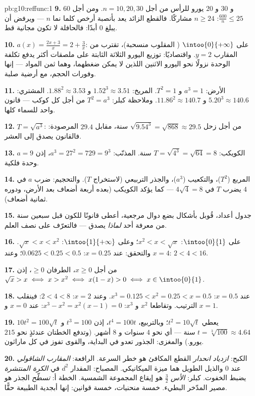 \begin{solution}{pb:g10:reffunc:1}
\textbf{9.} $60$ و $30$ و $20$ يورو للرأس من أجل $n = 10, 20,
30$. ومن أجل $\frac{600}{n} \leq 25$: $n \geq 24$ مشاركًا. فالقطع
الزائد يعد بأنصبة أرخص كلما نما $n$ --- ويرفض
أن يبلغ $0$ أبدًا: فالحافلة لا تكون مجانية قط.

\textbf{10.} $a(x) = \frac{2x + 3}{x} = 2 + \frac3x$:
 على $\intoo{0}{+\infty}$ ( المقلوب منسحبة)،
تقترب من المقارب $y = 2$. واقتصاديًا: توزيع اليورو
الثلاثة الثابتة على ملصقات أكثر يدفع تكلفة الوحدة نزولًا
نحو اليورو الاثنين اللذين لا يمكن ضغطهما، وهما ثمن المواد --- إنها وفورات
الحجم، مع أرضية صلبة.

\textbf{11.} الأرض: $a^3 = 1$ و $T^2 = 1$. المريخ:
$1.52^3 \approx 3.51$ و $1.88^2 \approx 3.53$. المشتري:
$5.20^3 \approx 140.6$ و $11.86^2 \approx 140.7$. وملاحظة
كبلر: $T^2 = a^3$ من أجل كل كوكب --- قانون واحد للسماء
كلها.

\textbf{12.} $T = \sqrt{a^3}$: من أجل زحل
$\sqrt{9.54^3} = \sqrt{868} \approx 29.5$ سنة، مقابل
$29.4$ المرصودة: فالقانون يصدق إلى العشر.

\textbf{13.} الكويكب: $T = \sqrt{4^3} = \sqrt{64} = 8$ سنة.
المذنّب: $a^3 = 27^2 = 729 = 9^3$، إذن $a = 9$ وحدة فلكية.

\textbf{14.} المربع ($T^2$)، والتكعيب ($a^3$)، والجذر التربيعي (لاستخراج
$T$). والتحجيم: ضرب $a$ في $4$ يضرب $T$ في
$4\sqrt4 = 8$ --- كما يؤكد الكويكب (بعده أربعة أضعاف
بعد الأرض، ودوره ثمانية أضعاف).

\textbf{15.} جدول أعداد، قُوبل بأشكال
بضع دوال مرجعية، أعطى قانونًا للكون
قبل سبعين سنة من معرفة أحد \emph{لماذا} يصدق ---
فالتعرّف على  نصف العلم.

\textbf{16.} على $\intoo{0}{1}$: $x^2 < x < \sqrt x$؛ وعلى
$\intoo{1}{+\infty}$: $\sqrt x < x < x^2$. والتحقق: عند
$x = 0.25$: $0.0625 < 0.25 < 0.5$؛ وعند $x = 4$:
$2 < 4 < 16$.

\textbf{17.} من أجل $x \geq 0$، الطرفان $\geq 0$، إذن
$\sqrt x > x \iff x > x^2 \iff x(1 - x) > 0 \iff
x \in \intoo{0}{1}$.

\textbf{18.} عند $x = 0.5$: $x^3 = 0.125 < x^2 = 0.25 < x =
0.5$. وعند $x = 2$: $2 < 4 < 8$: فينقلب الترتيب. وتقاطعا
$x^2$ و $x^3$: $x^3 - x^2 = x^2(x - 1) = 0$: عند $x = 0$ و
$x = 1$.

\textbf{19.} $10t^2 = 100\sqrt t$ يعطي $t^2 = 10\sqrt t$؛
وبالتربيع، $t^4 = 100t$، إذن $t^3 = 100$ و
$t = \sqrt[3]{100} \approx 4.64$ سنة --- أي نحو $4$ سنوات و
$8$ أشهر. (وتدفع الخطتان عندئذٍ نحو $215$ يورو.) والمغزى:
الجذور تعدو في البداية، والقوى تفوز في كل ماراثون.

\textbf{20.} الكبح: \emph{ازدياد انحدار} القطع المكافئ هو
خطر السرعة. الرافعة: \emph{المقارب الشاقولي} عند $0$
والذيل الطويل هما ميزة الميكانيكي. المصباح:
المقدار $d^2$ في \emph{الكرة المنتشرة} يضبط الخفوت. كبلر:
\emph{الأس} $\frac32$ هو إيقاع المجموعة الشمسية.
الخطة أ: \emph{تسطّح} الجذر هو مصير المدّخر البطيء.
خمسة منحنيات، خمسة قوانين: إنها أبجدية الطبيعة حقًّا.
\end{solution}
